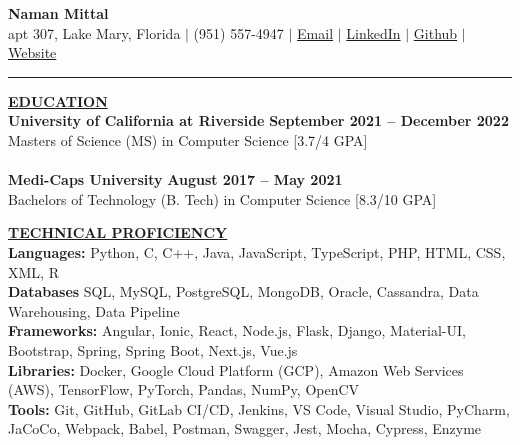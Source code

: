 \documentclass{article}
\begin{document}
\begin{center}
\thispagestyle{empty}
\large \textbf{\textbf{Naman Mittal}  \\}
\normalsize apt 307, Lake Mary, Florida $\mid$ (951) 557-4947 $\mid$ \href{mailto:nmitt005@ucr.edu}{Email} $\mid$ \href{www.linkedin.com/in/nmittal99}{LinkedIn} $\mid$  \href{github.com/palindrome1311}{Github} $\mid$  \href{www.mittalnaman.com}{Website}  \\
\rule{\textwidth}{1pt}
\end{center}

\noindent \textbf{\underline{EDUCATION}} \\
\noindent \textbf{University of California at Riverside} \hfill \textbf{September 2021 – December 2022} \\
Masters of Science (MS) in Computer Science [3.7/4 GPA]\\\\
\noindent \textbf{Medi-Caps University} \hfill \textbf{August 2017 – May 2021} \\
Bachelors of Technology (B. Tech) in Computer Science [8.3/10 GPA]


\vspace{2mm}

\noindent \textbf{\underline{TECHNICAL PROFICIENCY}} \\
\textbf{Languages:} Python, C, C++, Java, JavaScript, TypeScript, PHP, HTML, CSS, XML, R\\
\textbf{Databases}{ SQL, MySQL, PostgreSQL, MongoDB, Oracle, Cassandra, Data Warehousing, Data Pipeline} \\
\textbf{Frameworks:} Angular, Ionic, React, Node.js, Flask, Django, Material-UI, Bootstrap, Spring, Spring Boot, Next.js, Vue.js\\
\textbf{Libraries:} Docker, Google Cloud Platform (GCP), Amazon Web Services (AWS), TensorFlow, PyTorch, Pandas, NumPy, OpenCV\\
\textbf{Tools:} Git, GitHub, GitLab CI/CD, Jenkins, VS Code, Visual Studio, PyCharm, JaCoCo, Webpack, Babel, Postman, Swagger, Jest, Mocha, Cypress, Enzyme

\vspace{2mm}


\end{document}
